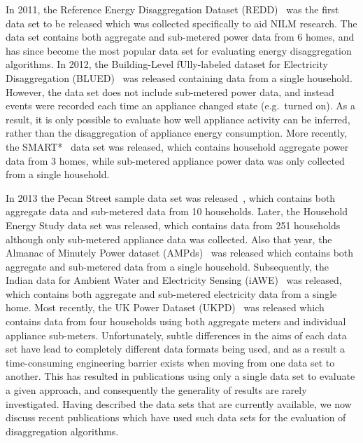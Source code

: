 \documentclass{sig-alternate}
\begin{document}
In 2011, the Reference Energy Disaggregation Dataset (REDD)~\cite{REDD} was the first data set to be released which was collected specifically to aid NILM research. The data set contains both aggregate and sub-metered power data from 6 homes, and has since become the most popular data set for evaluating energy disaggregation algorithms. In 2012, the Building-Level fUlly-labeled dataset for Electricity Disaggregation (BLUED)~\cite{blued} was released containing data from a single household. However, the data set does not include sub-metered power data, and instead events were recorded each time an appliance changed state (e.g.\ turned on). As a result, it is only possible to evaluate how well appliance activity can be inferred, rather than the disaggregation of appliance energy consumption. More recently, the SMART*~\cite{smart} data set was released, which contains household aggregate power data from 3 homes, while sub-metered appliance power data was only collected from a single household.

In 2013 the Pecan Street sample data set was released~\cite{pecan}, which contains both aggregate data and sub-metered data from 10 households. Later, the Household Energy Study data set was released, which contains data from 251 households although only sub-metered appliance data was collected. Also that year, the Almanac of Minutely Power dataset (AMPds)~\cite{ampds} was released which contains both aggregate and sub-metered data from a single household. Subsequently, the Indian data for Ambient Water and Electricity Sensing (iAWE)~\cite{iawe} was released, which contains both aggregate and sub-metered electricity data from a single home. Most recently, the UK Power Dataset (UKPD)~\cite{ukpd} was released which contains data from four households using both aggregate meters and individual appliance sub-meters. Unfortunately, subtle differences in the aims of each data set have lead to completely different data formats being used, and as a result a time-consuming engineering barrier exists when moving from one data set to another. This has resulted in publications using only a single data set to evaluate a given approach, and consequently the generality of results are rarely investigated. Having described the data sets that are currently available, we now discuss recent publications which have used such data sets for the evaluation of disaggregation algorithms.
\end{document}
